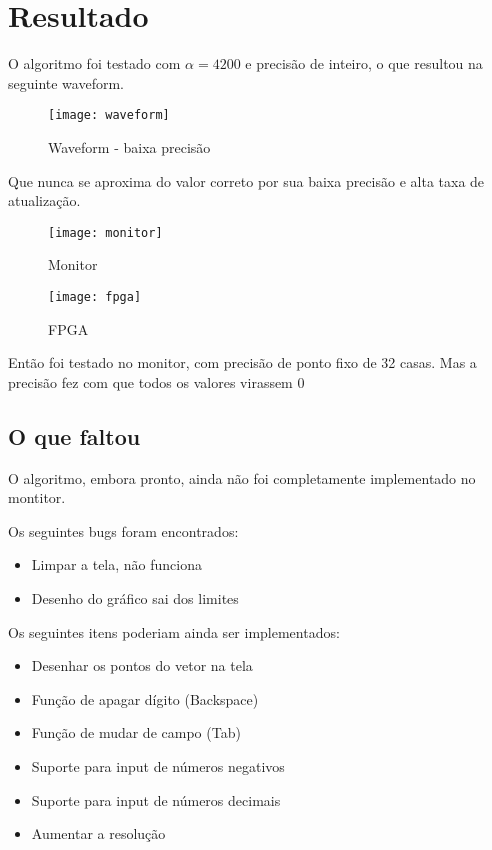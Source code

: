 \section{Resultado}

O algoritmo foi testado com $\alpha = 4200$ e precisão de inteiro,
o que resultou na seguinte waveform.

    \begin{figure} [H] 
        \texttt{[image: waveform]}
        \caption{Waveform - baixa precisão}
        \label{fig:waveform}
    \end{figure}

Que nunca se aproxima do valor correto por sua baixa precisão e alta taxa de atualização.

    \begin{figure} [H] 
        \texttt{[image: monitor]}
        \caption{Monitor}
        \label{fig:monitor}
    \end{figure}

    \begin{figure} [H] 
        \texttt{[image: fpga]}
        \caption{FPGA}
        \label{fig:fpga}
    \end{figure}

Então foi testado no monitor, com precisão de ponto fixo de 32 casas.
Mas a precisão fez com que todos os valores virassem 0

\subsection{O que faltou}

O algoritmo, embora pronto, ainda não foi completamente implementado no montitor.

Os seguintes bugs foram encontrados:

\begin{itemize}
    \item Limpar a tela, não funciona
    \item Desenho do gráfico sai dos limites
\end{itemize}

Os seguintes itens poderiam ainda ser implementados:

\begin{itemize}
    \item Desenhar os pontos do vetor na tela
    \item Função de apagar dígito (Backspace)
    \item Função de mudar de campo (Tab)
    \item Suporte para input de números negativos
    \item Suporte para input de números decimais
    \item Aumentar a resolução
\end{itemize}
